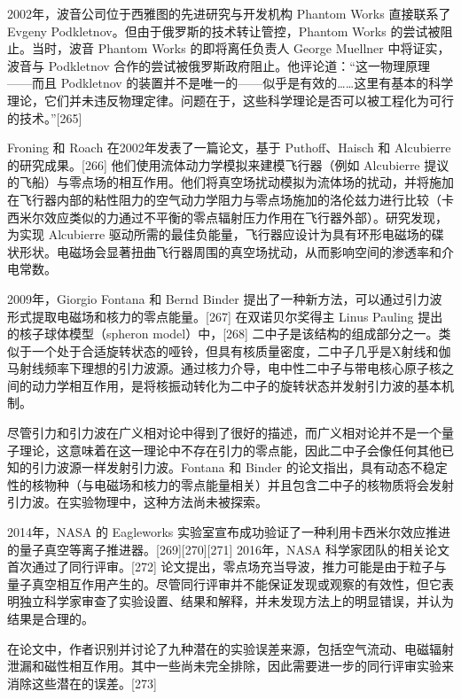 2002年，波音公司位于西雅图的先进研究与开发机构 Phantom Works 直接联系了 Evgeny Podkletnov。但由于俄罗斯的技术转让管控，Phantom Works 的尝试被阻止。当时，波音 Phantom Works 的即将离任负责人 George Muellner 中将证实，波音与 Podkletnov 合作的尝试被俄罗斯政府阻止。他评论道：“这一物理原理——而且 Podkletnov 的装置并不是唯一的——似乎是有效的……这里有基本的科学理论，它们并未违反物理定律。问题在于，这些科学理论是否可以被工程化为可行的技术。”[265]  

Froning 和 Roach 在2002年发表了一篇论文，基于 Puthoff、Haisch 和 Alcubierre 的研究成果。[266] 他们使用流体动力学模拟来建模飞行器（例如 Alcubierre 提议的飞船）与零点场的相互作用。他们将真空场扰动模拟为流体场的扰动，并将施加在飞行器内部的粘性阻力的空气动力学阻力与零点场施加的洛伦兹力进行比较（卡西米尔效应类似的力通过不平衡的零点辐射压力作用在飞行器外部）。研究发现，为实现 Alcubierre 驱动所需的最佳负能量，飞行器应设计为具有环形电磁场的碟状形状。电磁场会显著扭曲飞行器周围的真空场扰动，从而影响空间的渗透率和介电常数。  

2009年，Giorgio Fontana 和 Bernd Binder 提出了一种新方法，可以通过引力波形式提取电磁场和核力的零点能量。[267] 在双诺贝尔奖得主 Linus Pauling 提出的核子球体模型（spheron model）中，[268] 二中子是该结构的组成部分之一。类似于一个处于合适旋转状态的哑铃，但具有核质量密度，二中子几乎是X射线和伽马射线频率下理想的引力波源。通过核力介导，电中性二中子与带电核心原子核之间的动力学相互作用，是将核振动转化为二中子的旋转状态并发射引力波的基本机制。  

尽管引力和引力波在广义相对论中得到了很好的描述，而广义相对论并不是一个量子理论，这意味着在这一理论中不存在引力的零点能，因此二中子会像任何其他已知的引力波源一样发射引力波。Fontana 和 Binder 的论文指出，具有动态不稳定性的核物种（与电磁场和核力的零点能量相关）并且包含二中子的核物质将会发射引力波。在实验物理中，这种方法尚未被探索。  

2014年，NASA 的 Eagleworks 实验室宣布成功验证了一种利用卡西米尔效应推进的量子真空等离子推进器。[269][270][271] 2016年，NASA 科学家团队的相关论文首次通过了同行评审。[272] 论文提出，零点场充当导波，推力可能是由于粒子与量子真空相互作用产生的。尽管同行评审并不能保证发现或观察的有效性，但它表明独立科学家审查了实验设置、结果和解释，并未发现方法上的明显错误，并认为结果是合理的。  

在论文中，作者识别并讨论了九种潜在的实验误差来源，包括空气流动、电磁辐射泄漏和磁性相互作用。其中一些尚未完全排除，因此需要进一步的同行评审实验来消除这些潜在的误差。[273]  